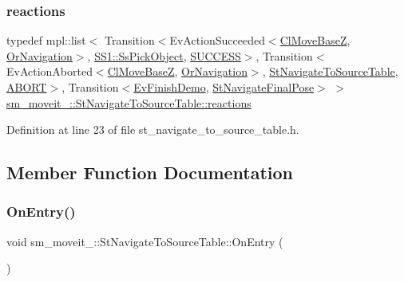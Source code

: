 \subsubsection{\texorpdfstring{reactions}{reactions}}
{\footnotesize\ttfamily typedef mpl\+::list$<$ Transition$<$Ev\+Action\+Succeeded$<$\hyperlink{classcl__move__base__z_1_1ClMoveBaseZ}{Cl\+Move\+BaseZ}, \hyperlink{classsm__moveit__4_1_1OrNavigation}{Or\+Navigation}$>$, \hyperlink{structsm__moveit__4_1_1SS1_1_1SsPickObject}{S\+S1\+::\+Ss\+Pick\+Object}, \hyperlink{classSUCCESS}{S\+U\+C\+C\+E\+SS}$>$, Transition$<$Ev\+Action\+Aborted$<$\hyperlink{classcl__move__base__z_1_1ClMoveBaseZ}{Cl\+Move\+BaseZ}, \hyperlink{classsm__moveit__4_1_1OrNavigation}{Or\+Navigation}$>$, \hyperlink{structsm__moveit__4_1_1StNavigateToSourceTable}{St\+Navigate\+To\+Source\+Table}, \hyperlink{classABORT}{A\+B\+O\+RT}$>$, Transition$<$\hyperlink{structsm__moveit__4_1_1EvFinishDemo}{Ev\+Finish\+Demo}, \hyperlink{structsm__moveit__4_1_1StNavigateFinalPose}{St\+Navigate\+Final\+Pose}$>$ $>$ \hyperlink{structsm__moveit__4_1_1StNavigateToSourceTable_ae1b19f752700392a40f225b02d677571}{sm\+\_\+moveit\+\_\+::\+St\+Navigate\+To\+Source\+Table\+::reactions}}



Definition at line 23 of file st\+\_\+navigate\+\_\+to\+\_\+source\+\_\+table.\+h.



\subsection{Member Function Documentation}
\mbox{\label{structsm__moveit__4_1_1StNavigateToSourceTable_aa90111c5a22ed67dfe20024a7b135837}} 
\subsubsection{\texorpdfstring{On\+Entry()}{OnEntry()}}
{\footnotesize\ttfamily void sm\+\_\+moveit\+\_\+::\+St\+Navigate\+To\+Source\+Table\+::\+On\+Entry (\begin{DoxyParamCaption}{ }\end{DoxyParamCaption})\hspace{0.3cm}{\ttfamily [inline]}}



